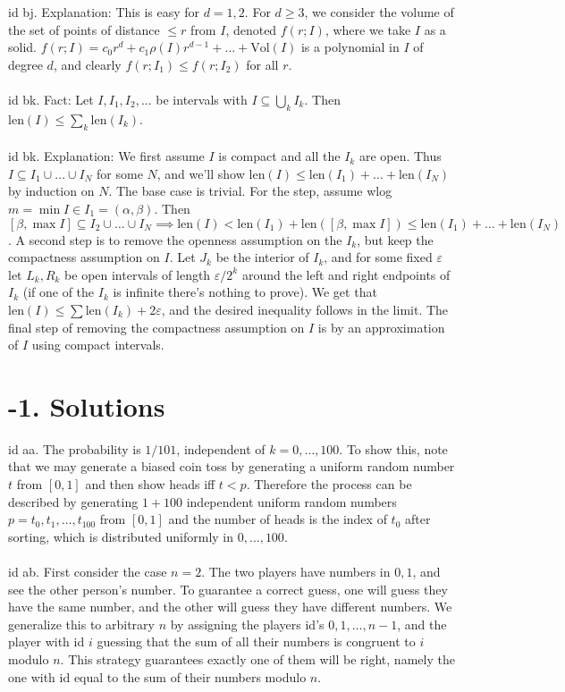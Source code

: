 \documentclass[oneside]{book}
\newcommand{\len}{\mathrm{len}}
\newcommand{\vol}{\mathrm{Vol}}
\newcommand{\sub}{\subseteq}
\newcommand{\eps}{\varepsilon}
\newcommand{\fit}[1]{\left( #1\right)}
\newcommand\chap[1]{%
  \chapter*{#1}%
  \addcontentsline{toc}{chapter}{#1}}
\begin{document}
id bj. Explanation: This is easy for $d=1,2$. For $d\ge 3$, we consider the volume of the set of points of distance $\le r$ from $I$, denoted $f(r;I)$, where we take $I$ as a solid. $f(r;I)=c_0 r^d + c_1\rho(I) r^{d-1}+\dots+\vol(I)$ is a polynomial in $I$ of degree $d$, and clearly $f(r;I_1)\le f(r;I_2)$ for all $r$.  \\\\


id bk. Fact: Let $I,I_1,I_2,\dots$ be intervals with $I\sub\bigcup_{k}I_k$. Then $\len(I)\le\sum_k \len(I_k)$. \\\\


id bk. Explanation: We first assume $I$ is compact and all the $I_k$ are open. Thus $I\sub I_1\cup\dots\cup I_N$ for some $N$, and we'll show $\len(I)\le\len(I_1)+\dots+\len(I_N)$ by induction on $N$. The base case is trivial. For the step, assume wlog $m=\min I\in I_1=(\alpha,\beta)$. Then $[\beta,\max I]\sub I_2\cup\dots\cup I_N\implies \len(I)< \len(I_1)+\len\fit{[\beta,\max I]}\le \len(I_1)+\dots+\len(I_N)$. A second step is to remove the openness assumption on the $I_k$, but keep the compactness assumption on $I$. Let $J_k$ be the interior of $I_k$, and for some fixed $\eps$ let $L_k,R_k$ be open intervals of length $\eps/2^k$ around the left and right endpoints of $I_k$ (if one of the $I_k$ is infinite there's nothing to prove). We get that $\len(I)\le \sum \len(I_k)+2\eps$, and the desired inequality follows in the limit. The final step of removing the compactness assumption on $I$ is by an approximation of $I$ using compact intervals. 




\newpage
\chap{-1. Solutions} \label{sol}
id aa. The probability is $1/101$, independent of $k=0,\dots,100$. To show this, note that we may generate a biased coin toss by generating a uniform random number $t$ from $[0,1]$ and then show heads iff $t<p$. Therefore the process can be described by generating $1+100$ independent uniform random numbers $p=t_0,t_1,\dots,t_{100}$ from $[0,1]$ and the number of heads is the index of $t_0$ after sorting, which is distributed uniformly in $0,\dots,100$.  \\\\


id ab. First consider the case $n=2$. The two players have numbers in $0,1$, and see the other person's number. To guarantee a correct guess, one will guess they have the same number, and the other will guess they have different numbers. We generalize this to arbitrary $n$ by assigning the players id's $0,1,\dots,n-1$, and the player with id $i$ guessing that the sum of all their numbers is congruent to $i$ modulo $n$. This strategy guarantees exactly one of them will be right, namely the one with id equal to the sum of their numbers modulo $n$.     \\\\
\end{document}
